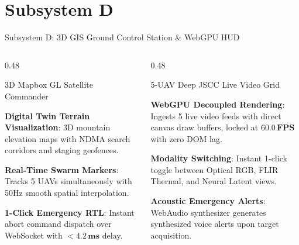 \documentclass[aspectratio=169, 10pt]{beamer}
\begin{document}
\section{Subsystem D}
\begin{frame}{Subsystem D: 3D GIS Ground Control Station \& WebGPU HUD}
  \begin{columns}[T]
    \begin{column}{0.48\textwidth}
      \begin{defensecard}{3D Mapbox GL Satellite Commander}
        \begin{itemize}\setlength{\itemsep}{3pt}
          {\tiny
            \item \textbf{Digital Twin Terrain Visualization}: 3D mountain elevation maps with NDMA search corridors and staging geofences.
            \item \textbf{Real-Time Swarm Markers}: Tracks 5 UAVs simultaneously with 50Hz smooth spatial interpolation.
            \item \textbf{1-Click Emergency RTL}: Instant abort command dispatch over WebSocket with $<\mathbf{4.2\,\text{ms}}$ delay.
          }
        \end{itemize}
      \end{defensecard}
    \end{column}

    \begin{column}{0.48\textwidth}
      \begin{highlightcard}{5-UAV Deep JSCC Live Video Grid}
        \begin{itemize}\setlength{\itemsep}{3pt}
          {\tiny
            \item \textbf{WebGPU Decoupled Rendering}: Ingests 5 live video feeds with direct canvas draw buffers, locked at $\mathbf{60.0\,\text{FPS}}$ with zero DOM lag.
            \item \textbf{Modality Switching}: Instant 1-click toggle between Optical RGB, FLIR Thermal, and Neural Latent views.
            \item \textbf{Acoustic Emergency Alerts}: WebAudio synthesizer generates synthesized voice alerts upon target acquisition.
          }
        \end{itemize}
      \end{highlightcard}
    \end{column}
  \end{columns}
\end{frame}
\end{document}

